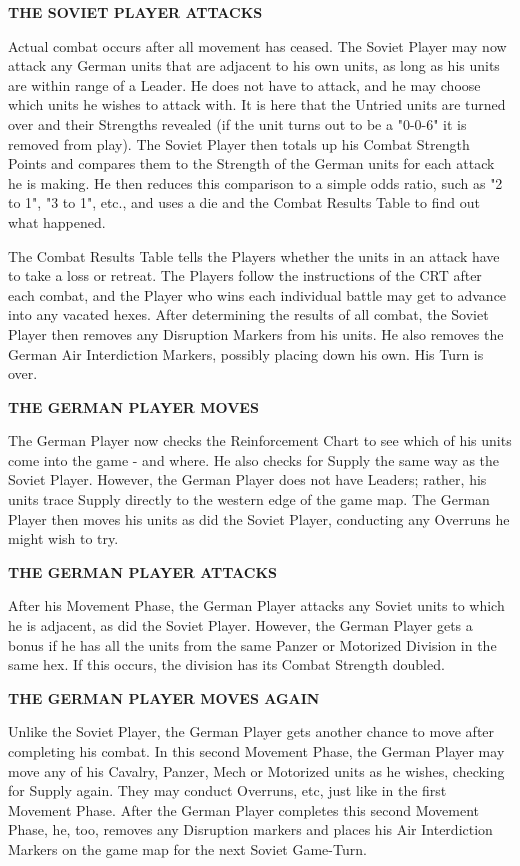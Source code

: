 \textbf{THE SOVIET PLAYER ATTACKS}

Actual combat occurs after all movement has ceased. The Soviet Player may now attack any German units that are adjacent to his own units, as long as his units are within range of a Leader. He does not have to attack, and he may choose which units he wishes to attack with. It is here that the Untried units are turned over and their Strengths revealed (if the unit turns out to be a "0-0-6" it is removed from play). The Soviet Player then totals up his Combat Strength Points and compares them to the Strength of the German units for each attack he is making. He then reduces this comparison to a simple odds ratio, such as "2 to 1", "3 to 1", etc., and uses a die and the Combat Results Table to find out what happened.

The Combat Results Table tells the Players whether the units in an attack have to take a loss or retreat. The Players follow the instructions of the CRT after each combat, and the Player who wins each individual battle may get to advance into any vacated hexes. After determining the results of all combat, the Soviet Player then removes any Disruption Markers from his units. He also removes the German Air Interdiction Markers, possibly placing down his own. His Turn is over.

\textbf{THE GERMAN PLAYER MOVES}

The German Player now checks the Reinforcement Chart to see which of his units come into the game - and where. He also checks for Supply the same way as the Soviet Player. However, the German Player does not have Leaders; rather, his units trace Supply directly to the western edge of the game map. The German Player then moves his units as did the Soviet Player, conducting any Overruns he might wish to try.

\textbf{THE GERMAN PLAYER ATTACKS}

After his Movement Phase, the German Player attacks any Soviet units to which he is adjacent, as did the Soviet Player. However, the German Player gets a bonus if he has all the units from the same Panzer or Motorized Division in the same hex. If this occurs, the division has its Combat Strength doubled.

\begin{flushleft}
  \textbf{THE GERMAN PLAYER MOVES AGAIN}
\end{flushleft}

Unlike the Soviet Player, the German Player gets another chance to move after completing his combat. In this second Movement Phase, the German Player may move any of his Cavalry, Panzer, Mech or Motorized units as he wishes, checking for Supply again. They may conduct Overruns, etc, just like in the first Movement Phase. After the German Player completes this second Movement Phase, he, too, removes any Disruption markers and places his Air Interdiction Markers on the game map for the next Soviet Game-Turn.


